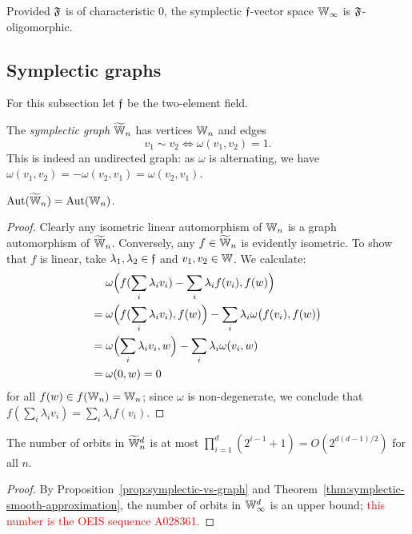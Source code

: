 \begin{corollary}
    Provided $\mathfrak{F}$ is of characteristic $0$, the symplectic $\mathfrak{f}$-vector space $\mathbb{W}_\infty$ is $\mathfrak{F}$-oligomorphic.
\end{corollary}




\subsection{Symplectic graphs}
For this subsection let $\mathfrak{f}$ be the two-element field.
\begin{definition}
    The \emph{symplectic graph} $\widetilde {\mathbb{W}}_n$ has vertices $\mathbb{W}_n$ and edges
    \[
        v_1 \sim v_2 \iff \omega(v_1, v_2) = 1.
    \]
    This is indeed an undirected graph: as $\omega$ is alternating, we have $\omega(v_1, v_2) = -\omega(v_2, v_1) = \omega(v_2, v_1)$.    
\end{definition}

\begin{proposition}\label{prop:symplectic-vs-graph}
    $\operatorname{Aut}(\widetilde {\mathbb{W}}_n) = \operatorname{Aut}(\mathbb{W}_n)$.
\end{proposition}
\begin{proof}
    Clearly any isometric linear automorphism of $\mathbb{W}_n$ is a graph automorphism of $\widetilde {\mathbb{W}}_n$.
    Conversely, any $f \in \widetilde {\mathbb{W}}_n$ is evidently isometric.
    To show that $f$ is linear, take $\lambda_1, \lambda_2 \in \mathfrak{f}$ and $v_1, v_2 \in \mathbb{W}$.
    We calculate:
    \begin{align*}
        &\omega\Bigl( f(\sum_i \lambda_i v_i) - \sum_i \lambda_i f(v_i) , f(w) \Bigr) \\
        ={}& \omega\Bigl( f(\sum_i \lambda_i v_i), f(w)\Bigr) - \sum_i \lambda_i \omega\bigl(f(v_i), f(w) \bigr) \\
        ={}& \omega\Bigl( \sum_i \lambda_i v_i, w \Bigr) - \sum_i \lambda_i \omega( v_i, w ) \\
        ={}& \omega(0, w) = 0
    \end{align*}
    for all $f(w) \in f(\mathbb{W}_n) = \mathbb{W}_n$;
    since $\omega$ is non-degenerate, 
    we conclude that $f(\sum_i \lambda_i v_i) = \sum_i \lambda_i f(v_i)$.
\end{proof}

\begin{proposition}
    The number of orbits in $\widetilde {\mathbb{W}}_n^d$ is at most 
        $\prod_{i=1}^{d} (2^{i-1} + 1) = O(2^{d (d-1) / 2})$ 
    for all $n$.
\end{proposition}
\begin{proof}
    By Proposition~\ref{prop:symplectic-vs-graph} and Theorem~\ref{thm:symplectic-smooth-approximation},
    the number of orbits in $\mathbb{W}_\infty^d$ is an upper bound;
    \textcolor{red}{this number is the OEIS sequence A028361.}
\end{proof}

